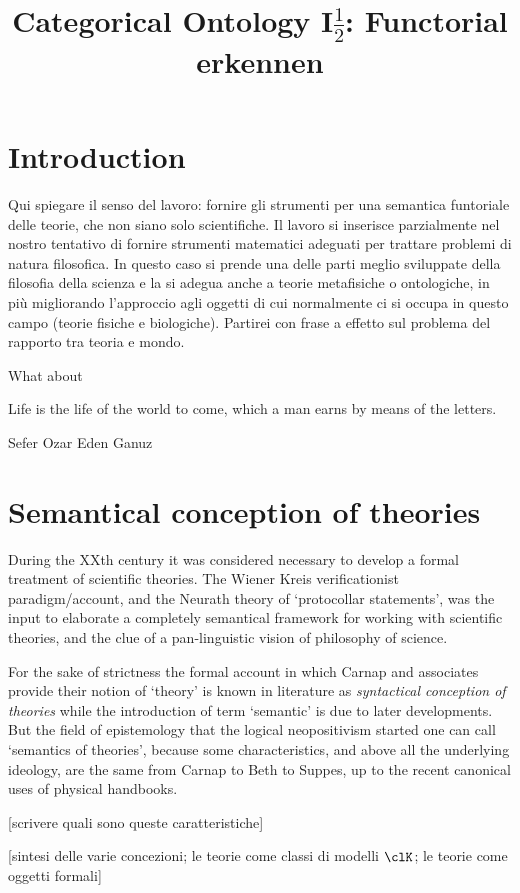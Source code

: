\documentclass[a4paper]{../birkjour}
\title{Categorical Ontology I$\frac{1}{2}$: Functorial erkennen}
\begin{document}
\maketitle
\tableofcontents

\section{Introduction}
Qui spiegare il senso del lavoro: fornire gli strumenti per una semantica funtoriale delle teorie, che non siano solo scientifiche. Il lavoro si inserisce parzialmente nel nostro tentativo di fornire strumenti matematici adeguati per trattare problemi di natura filosofica. In questo caso si prende una delle parti meglio sviluppate della filosofia della scienza e la si adegua anche a teorie metafisiche o ontologiche, in più migliorando l'approccio agli oggetti di cui normalmente ci si occupa in questo campo (teorie fisiche e biologiche). Partirei con frase a effetto sul problema del rapporto tra teoria e mondo.

What about 

\epigraph{Life is the life of the world to come, which a man earns by means of the letters.}{Sefer Ozar Eden Ganuz}

\section{Semantical conception of theories}
During the XXth century it was considered necessary to develop a formal treatment of scientific theories. The Wiener Kreis verificationist paradigm/account, and the Neurath theory of `protocollar statements', was the input to elaborate a completely semantical framework for working with scientific theories, and the clue of a pan-linguistic vision of philosophy of science. 

For the sake of strictness the formal account in which Carnap and associates provide their notion of `theory' is known in literature as \emph{syntactical conception of theories} \cite{.} while the introduction of term `semantic' is due to later developments. But the field of epistemology that the logical neopositivism started one can call `semantics of theories', because some characteristics, and above all the underlying ideology, are the same from Carnap to Beth to Suppes, up to the recent canonical uses of physical handbooks. 

[scrivere quali sono queste caratteristiche]

[sintesi delle varie concezioni; le teorie come classi di modelli $\clK$; 
le teorie come oggetti formali]
\end{document}
